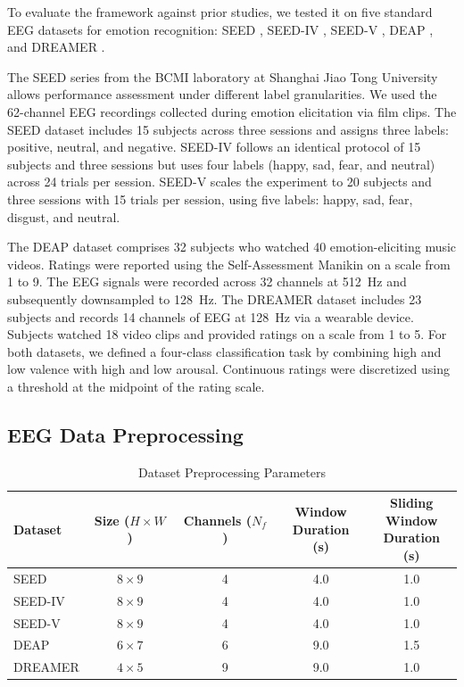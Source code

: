 \documentclass[12pt]{article}
\begin{document}
To evaluate the framework against prior studies, we tested it on five standard EEG datasets for emotion recognition: SEED \cite{ref65}, SEED-IV \cite{ref48}, SEED-V \cite{ref49}, DEAP \cite{ref50}, and DREAMER \cite{ref51}.

The SEED series from the BCMI laboratory at Shanghai Jiao Tong University allows performance assessment under different label granularities. We used the 62-channel EEG recordings collected during emotion elicitation via film clips. The SEED dataset includes 15 subjects across three sessions and assigns three labels: positive, neutral, and negative. SEED-IV follows an identical protocol of 15 subjects and three sessions but uses four labels (happy, sad, fear, and neutral) across 24 trials per session. SEED-V scales the experiment to 20 subjects and three sessions with 15 trials per session, using five labels: happy, sad, fear, disgust, and neutral.

The DEAP dataset comprises 32 subjects who watched 40 emotion-eliciting music videos. Ratings were reported using the Self-Assessment Manikin on a scale from 1 to 9. The EEG signals were recorded across 32 channels at 512~Hz and subsequently downsampled to 128~Hz. The DREAMER dataset includes 23 subjects and records 14 channels of EEG at 128~Hz via a wearable device. Subjects watched 18 video clips and provided ratings on a scale from 1 to 5. For both datasets, we defined a four-class classification task by combining high and low valence with high and low arousal. Continuous ratings were discretized using a threshold at the midpoint of the rating scale.

\subsection{EEG Data Preprocessing}\label{supp:preprocessing}
\begin{table}[h]
\centering
\caption{Dataset Preprocessing Parameters}
\label{tab:preprocessing_params}
\vspace{2pt}
\begin{tabular}{@{}lcccc@{}}
\toprule
Dataset &
\makecell{Size\\($H \times W$)}&
\makecell{Channels\\($N_f$)}&
\makecell{Window\\Duration (s)}&
\makecell{Sliding\\Window\\Duration (s)}\\
\midrule
SEED      & $8 \times 9$ & 4 & 4.0 & 1.0 \\
SEED-IV   & $8 \times 9$ & 4 & 4.0 & 1.0 \\
SEED-V    & $8 \times 9$ & 4 & 4.0 & 1.0 \\
DEAP      & $6 \times 7$ & 6 & 9.0 & 1.5 \\
DREAMER   & $4 \times 5$ & 9 & 9.0 & 1.0 \\
\bottomrule
\end{tabular}
\end{table}
\end{document}

